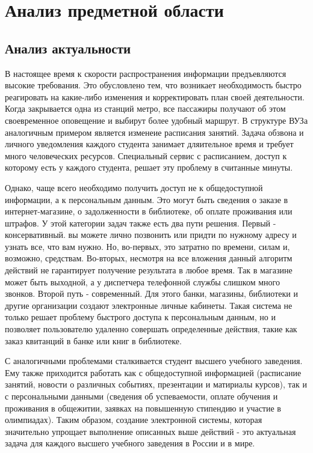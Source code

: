 \chapter{Анализ предметной области}

\section{Анализ актуальности}
В настоящее время к скорости распространения информации предъевляются высокие требования. Это обусловлено тем, что возникает необходимость быстро реагировать на какие-либо изменения и корректировать план своей деятельности. Когда закрывается одна из станций метро, все пассажиры получают об этом своевременное оповещение и выбирут более удобный маршрут. В структуре ВУЗа аналогичным примером является изменеие расписания занятий. Задача обзвона и личного уведомления каждого студента занимает дляительное время и требует много человеческих ресурсов. Специальный сервис с расписанием, доступ к которому есть у каждого студента, решает эту проблему в считанные минуты.

Однако, чаще всего необходимо получить доступ не к общедоступной информации, а к персональным данным. Это могут быть сведения о заказе в интернет-магазине, о задолженности в библиотеке, об оплате проживания или штрафов. У этой категории задач также есть два пути решения. Первый - консервативный. вы можете лично позвонить или придти по нужному адресу и узнать все, что вам нужно. Но, во-первых, это затратно по времени, силам и, возможно, средствам. Во-вторых, несмотря на все вложения данный алгоритм действий не гарантирует получение результата в любое время. Так в магазине может быть выходной, а у диспетчера телефонной службы слишком много звонков. Второй путь - современный. Для этого банки, магазины, библиотеки и другие организации создают электронные личные кабинеты. Такая система не только решает проблему быстрого доступа к персональным данным, но и позволяет пользователю удаленно совершать определенные действия, такие как заказ квитанций в банке или книг в библиотеке.

С аналогичными проблемами сталкивается студент высшего учебного заведения. Ему также приходится работать как с общедоступной информацией (расписание занятий, новости о различных событиях, презентации  и матириалы курсов), так и с персональными данными (сведения об успеваемости, оплате обучения и проживания в общежитии, заявках на повышенную стипендию и участие в олимпиадах). Таким образом, создание электронной системы, которая значительно упрощает выполнение описанных выше действий - это актуальная задача для каждого высшего учебного заведения в России и в мире.

